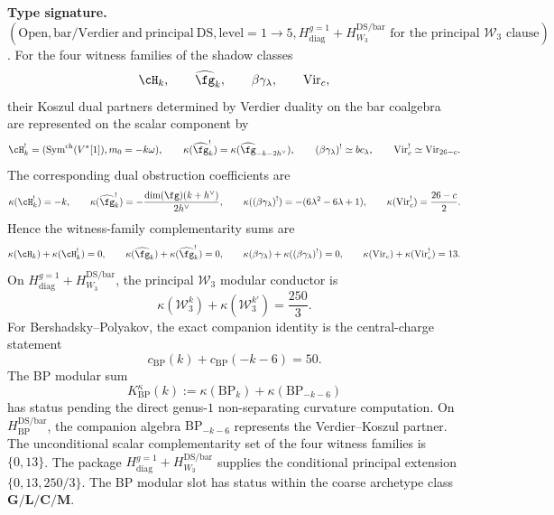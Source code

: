 \begin{theorem}
\label{thm:census-witness-complementarity}
\textbf{Type signature.}
$(\mathrm{Open},\mathrm{bar/Verdier\ and\ principal\ DS},
\mathrm{level}=1\to5,
H_{\mathrm{diag}}^{g=1}+H_{W_3}^{\mathrm{DS/bar}}
\text{ for the principal }\mathcal W_3\text{ clause})$.
For the four witness families of the shadow classes
\[
 \cH_k,\qquad
 \widehat{\fg}_k,\qquad
 \beta\gamma_\lambda,\qquad
 \mathrm{Vir}_c,
\]
their Koszul dual partners determined by Verdier duality on the bar
coalgebra are represented on the scalar component by
\[
 \cH_k^!=(\mathrm{Sym}^{\mathrm{ch}}(V^*[1]),m_0=-k\omega),\qquad
 \kappa(\widehat{\fg}_k^!)
 = \kappa(\widehat{\fg}_{-k-2h^\vee}),\qquad
 (\beta\gamma_\lambda)^! \simeq bc_\lambda,\qquad
 \mathrm{Vir}_c^! \simeq \mathrm{Vir}_{26-c}.
\]
The corresponding dual obstruction coefficients are
\[
 \kappa(\cH_k^!) = -k,\qquad
 \kappa(\widehat{\fg}_k^!)
 = -\frac{\dim(\fg)(k+h^\vee)}{2h^\vee},\qquad
 \kappa((\beta\gamma_\lambda)^!)
 = -(6\lambda^2 - 6\lambda + 1),\qquad
 \kappa(\mathrm{Vir}_c^!) = \frac{26-c}{2}.
\]
Hence the witness-family complementarity sums are
\[
 \kappa(\cH_k) + \kappa(\cH_k^!) = 0,\qquad
 \kappa(\widehat{\fg}_k) + \kappa(\widehat{\fg}_k^!) = 0,\qquad
 \kappa(\beta\gamma_\lambda) + \kappa((\beta\gamma_\lambda)^!) = 0,\qquad
 \kappa(\mathrm{Vir}_c) + \kappa(\mathrm{Vir}_c^!) = 13.
\]
On
$H_{\mathrm{diag}}^{g=1}+H_{W_3}^{\mathrm{DS/bar}}$, the principal
$\mathcal{W}_3$ modular conductor is
\[
 \kappa(\mathcal{W}_3^k) + \kappa(\mathcal{W}_3^{k'})
 = \frac{250}{3}.
\]
For Bershadsky--Polyakov, the exact companion identity is the
central-charge statement
\[
 c_{\mathrm{BP}}(k)+c_{\mathrm{BP}}(-k-6)=50.
\]
The BP modular sum
\[
 K^\kappa_{\mathrm{BP}}(k)
 :=\kappa(\mathrm{BP}_k)+\kappa(\mathrm{BP}_{-k-6})
\]
has status \ClaimStatusOpen pending the direct genus-$1$
non-separating curvature computation.  On
$H_{\mathrm{BP}}^{\mathrm{DS/bar}}$, the companion algebra
$\mathrm{BP}_{-k-6}$ represents the Verdier--Koszul partner.  The
unconditional scalar complementarity set of the four witness families
is $\{0,13\}$.  The package
$H_{\mathrm{diag}}^{g=1}+H_{W_3}^{\mathrm{DS/bar}}$ supplies the
conditional principal extension $\{0,13,250/3\}$.  The BP modular
slot has status \ClaimStatusOpen within the coarse archetype
class~$\mathbf{G}/\mathbf{L}/\mathbf{C}/\mathbf{M}$.
\end{theorem}

